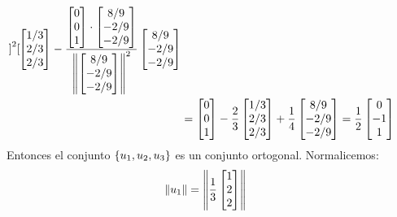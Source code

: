 \begin{solution}
\begin{align*}
{{\begin{bmatrix}
		\end{bmatrix}
		}^{2}}
		\begin{bmatrix}
			1/3 \\ 2/3 \\ 2/3
		\end{bmatrix}
	 	-
	 	\dfrac{
 		\begin{bmatrix}
 			0 \\ 0 \\ 1
 		\end{bmatrix}
 		\cdot
 		\begin{bmatrix}
 			8/9 \\ -2/9 \\ -2/9
 		\end{bmatrix}
	 	}{\left\Vert 
		\begin{bmatrix}
			8/9 \\ -2/9 \\ -2/9
		\end{bmatrix}
 		 \right\Vert^{2}}
	 	\begin{bmatrix}
	 		8/9 \\ -2/9 \\ -2/9
	 	\end{bmatrix}\\
 		&= 
 		\begin{bmatrix}
 			0 \\ 0 \\ 1
 		\end{bmatrix}
 		-\dfrac{2}{3}
 		\begin{bmatrix}
 			1/3 \\ 2/3 \\ 2/3
 		\end{bmatrix}
 		+\dfrac{1}{4}
 		\begin{bmatrix}
 			8/9 \\ -2/9 \\ -2/9
 		\end{bmatrix} = \dfrac{1}{2}
 		\begin{bmatrix}
 			0 \\ -1 \\ 1
 		\end{bmatrix}
	\end{align*}
	Entonces el conjunto $\left\{ u_{1}, u_{2}, u_{3} \right\}$ es un conjunto ortogonal. Normalicemos:
	\begin{align*}
		\left\Vert u_{1} \right\Vert &=\left\Vert \dfrac{1}{3}
		\begin{bmatrix}
			1 \\ 2 \\ 2
		\end{bmatrix}
 \right\Vert
\end{align*}
\end{solution}
